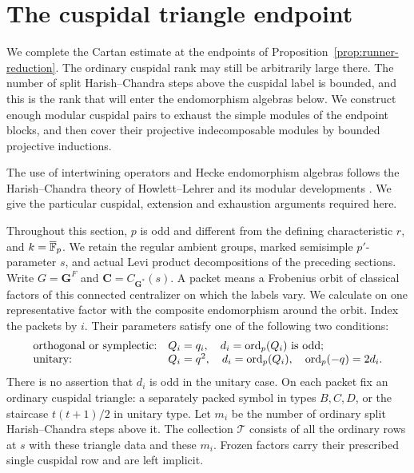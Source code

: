 \section{The cuspidal triangle endpoint}\label{sec:endpoint}

We complete the Cartan estimate at the endpoints of
Proposition~\ref{prop:runner-reduction}.  The ordinary cuspidal rank may
still be arbitrarily large there.  The number of split Harish--Chandra
steps above the cuspidal label is bounded, and this is the rank that will
enter the endomorphism algebras below.  We construct enough modular
cuspidal pairs to exhaust the simple modules of the endpoint blocks,
and then cover their projective indecomposable modules by bounded
projective inductions.

The use of intertwining operators and Hecke endomorphism algebras
follows the Harish--Chandra theory of Howlett--Lehrer
\cite{HowlettLehrer} and its modular developments
\cite{DipperFleischmann,DipperDu}.  We give the particular cuspidal,
extension and exhaustion arguments required here.

Throughout this section, $p$ is odd and different from the defining
characteristic $r$, and $k=\overline{\mathbb F}_p$.  We retain the regular
ambient groups, marked semisimple $p'$-parameter $s$, and actual Levi
product decompositions of the preceding sections.  Write
$G=\mathbf G^F$ and $\mathbf C=C_{\mathbf G^*}(s)$.  A packet means a
Frobenius orbit of classical factors of this connected centralizer on
which the labels vary.  We calculate on one representative factor
with the composite endomorphism around the orbit.  Index the packets
by $i$.  Their parameters satisfy
one of the following two conditions:
\begin{equation}\label{end:linear-primes}
\begin{array}{ll}
\text{orthogonal or symplectic:}&
 Q_i=q_i,\quad d_i=\operatorname{ord}_p(Q_i)\text{ is odd};\\
\text{unitary:}&
 Q_i=q^2,\quad d_i=\operatorname{ord}_p(Q_i),\quad \operatorname{ord}_p(-q)=2d_i.
\end{array}
\end{equation}
There is no assertion that $d_i$ is odd in the unitary case.
On each packet fix an ordinary cuspidal triangle: a separately packed
symbol in types $B,C,D$, or the staircase $t(t+1)/2$ in unitary type.
Let $m_i$ be the number of ordinary split Harish--Chandra steps above
it.  The collection $\mathcal T$ consists of all the ordinary rows at
$s$ with these triangle data and these $m_i$.  Frozen factors carry
their prescribed single cuspidal row and are left implicit.

